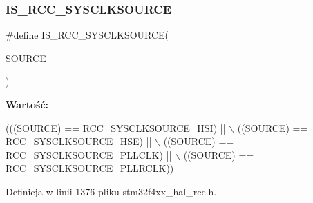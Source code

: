\subsubsection{\texorpdfstring{I\+S\+\_\+\+R\+C\+C\+\_\+\+S\+Y\+S\+C\+L\+K\+S\+O\+U\+R\+CE}{IS\_RCC\_SYSCLKSOURCE}}
{\footnotesize\ttfamily \#define I\+S\+\_\+\+R\+C\+C\+\_\+\+S\+Y\+S\+C\+L\+K\+S\+O\+U\+R\+CE(\begin{DoxyParamCaption}\item[{}]{S\+O\+U\+R\+CE }\end{DoxyParamCaption})}

{\bfseries Wartość\+:}
\begin{DoxyCode}
(((SOURCE) == \hyperlink{group___r_c_c___system___clock___source_gaaeeb699502e7d7a9f1b5d57fcf1f5095}{RCC\_SYSCLKSOURCE\_HSI}) || \(\backslash\)
                                     ((SOURCE) == \hyperlink{group___r_c_c___system___clock___source_ga9116d0627e1e7f33c48e1357b9a35a1c}{RCC\_SYSCLKSOURCE\_HSE}) || \(\backslash\)
                                     ((SOURCE) == \hyperlink{group___r_c_c___system___clock___source_ga5caf08ac71d7dd7e7b2e3e421606aca7}{RCC\_SYSCLKSOURCE\_PLLCLK}) || \(\backslash\)
                                     ((SOURCE) == \hyperlink{group___r_c_c___system___clock___source_ga1fa5dbd16ee193b62cfc42418a62f48d}{RCC\_SYSCLKSOURCE\_PLLRCLK}))
\end{DoxyCode}


Definicja w linii 1376 pliku stm32f4xx\+\_\+hal\+\_\+rcc.\+h.

